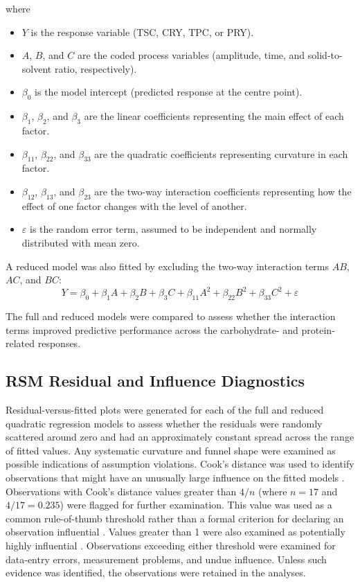 \documentclass[MScDSA]{uccthesis}
\begin{document}
where
\begin{itemize}
    \item $Y$ is the response variable (TSC, CRY, TPC, or PRY).
    \item $A$, $B$, and $C$ are the coded process variables (amplitude, time, and solid-to-solvent ratio, respectively).
    \item $\beta_0$ is the model intercept (predicted response at the centre point).
    \item $\beta_1$, $\beta_2$, and $\beta_3$ are the linear coefficients representing the main effect of each factor.
    \item $\beta_{11}$, $\beta_{22}$, and $\beta_{33}$ are the quadratic coefficients representing curvature in each factor.
    \item $\beta_{12}$, $\beta_{13}$, and $\beta_{23}$ are the two-way interaction coefficients representing how the effect of one factor changes with the level of another.
    \item $\varepsilon$ is the random error term, assumed to be independent and normally distributed with mean zero.
\end{itemize}

A reduced model was also fitted by excluding the two-way interaction terms $AB$, $AC$, and $BC$:
\begin{equation}
Y = \beta_0 + \beta_1 A + \beta_2 B + \beta_3 C + \beta_{11}A^2 + \beta_{22}B^2 + \beta_{33}C^2 + \varepsilon
\label{eq:red_quadratic_model}
\end{equation}

The full and reduced models were compared to assess whether the interaction terms improved predictive performance across the carbohydrate- and protein-related responses.

\subsection{RSM Residual and Influence Diagnostics}
\label{sec:inf_diagnostics}
Residual-versus-fitted plots were generated for each of the full and reduced quadratic regression models to assess whether the residuals were randomly scattered around zero and had an approximately constant spread across the range of fitted values. Any systematic curvature and funnel shape were examined as possible indications of assumption violations. Cook's distance was used to identify observations that might have an unusually large influence on the fitted models \parencite{Cook:1977}. Observations with Cook's distance values greater than $4/n$ (where $n=17$ and $4/17= 0.235$) were flagged for further examination. This value was used as a common rule-of-thumb threshold rather than a formal criterion for declaring an observation influential \parencite{Yellowbrick:2022}. Values greater than 1 were also examined as potentially highly influential . Observations exceeding either threshold were examined for data-entry errors, measurement problems, and undue influence. Unless such evidence was identified, the observations were retained in the analyses. 
\end{document}
